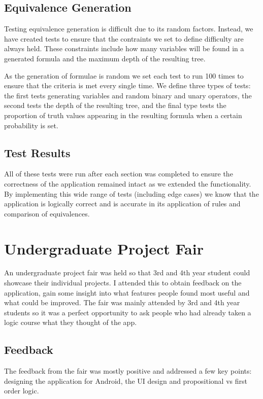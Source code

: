 \documentclass{report}
\begin{document}
\subsection{Equivalence Generation}

Testing equivalence generation is difficult due to its random factors. Instead, we have created tests to ensure that the contraints we set to define difficulty are always held. These constraints include how many variables will be found in a generated formula and the maximum depth of the resulting tree.

As the generation of formulae is random we set each test to run 100 times to ensure that the criteria is met every single time. We define three types of tests: the first tests generating variables and random binary and unary operators, the second tests the depth of the resulting tree, and the final type tests the proportion of truth values appearing in the resulting formula when a certain probability is set.

\subsection{Test Results}

All of these tests were run after each section was completed to ensure the correctness of the application remained intact as we extended the functionality. By implementing this wide range of tests (including edge cases) we know that the application is logically correct and is accurate in its application of rules and comparison of equivalences.

\section{Undergraduate Project Fair}

An undergraduate project fair was held so that 3rd and 4th year student could showcase their individual projects. I attended this to obtain feedback on the application, gain some insight into what features people found most useful and what could be improved. The fair was mainly attended by 3rd and 4th year students so it was a perfect opportunity to ask people who had already taken a logic course what they thought of the app.

\subsection{Feedback}

The feedback from the fair was mostly positive and addressed a few key points: designing the application for Android, the UI design and propositional vs first order logic.
\end{document}
